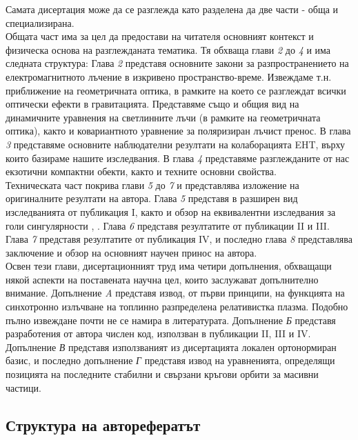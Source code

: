 \documentclass[12pt]{article}
\numberwithin{equation}{section}
\numberwithin{figure}{section}
\begin{document}
	Самата дисертация може да се разглежда като разделена да две части - обща и специализирана.\\
	
	Общата част има за цел да предостави на читателя основният контекст и физическа основа на разглежданата тематика. Тя обхваща глави \emph{2} до \emph{4} и има следната структура: Глава \emph{2} представя основните закони за разпространението на електромагнитното лъчение в изкривено пространство-време. Извеждаме т.н. приближение на геометричната оптика, в рамките на което се разглеждат всички оптически ефекти в гравитацията. Представяме също и общия вид на динамичните уравнения на светлинните лъчи (в рамките на геометричната оптика), както и ковариантното уравнение за поляризиран лъчист пренос. В глава \emph{3} представяме основните наблюдателни резултати на колаборацията EHT, върху които базираме нашите изследвания. В глава \emph{4} представяме разглежданите от нас екзотични компактни обекти, както и техните основни свойства.\\
	
	Техническата част покрива глави \emph{5} до \emph{7} и представлява изложение на оригиналните резултати на автора. Глава \emph{5} представя в разширен вид изследванията от публикация I, както и обзор на еквивалентни изследвания за голи сингулярности \cite{Gyulchev2020}, \cite{Gyulchev2021}. Глава \emph{6} представя резултатите от публикации II и III. Глава \emph{7} представя резултатите от публикация IV, и последно глава \emph{8} представлява заключение и обзор на основният научен принос на автора.\\
	
	\noindent Освен тези глави, дисертационният труд има четири допълнения, обхващащи някой аспекти на поставената научна цел, които заслужават допълнително внимание. Допълнение \emph{A} представя извод, от първи принципи, на функцията на синхотронно излъчване на топлинно разпределена релативистка плазма. Подобно пълно извеждане почти не се намира в литературата. Допълнение \emph{Б} представя разработения от автора числен код, използван в публикации II, III и IV. Допълнение \emph{В} представя използваният из дисертацията локален ортонормиран базис, и последно допълнение \emph{Г} представя извод на уравненията, определящи позицията на последните стабилни и свързани кръгови орбити за масивни частици.
	
	\subsection{Структура на авторефератът}
	
\end{document}
